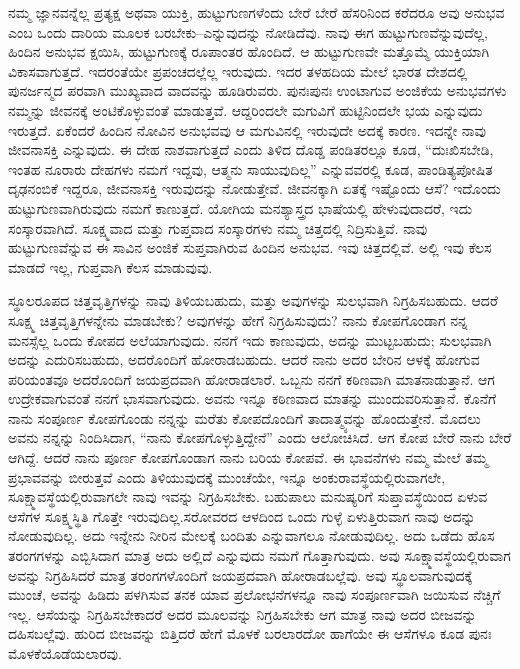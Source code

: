 ನಮ್ಮ ಜ್ಞಾನವನ್ನೆಲ್ಲ ಪ್ರತ್ಯಕ್ಷ ಅಥವಾ ಯುಕ್ತಿ, ಹುಟ್ಟುಗುಣಗಳೆಂದು ಬೇರೆ ಬೇರೆ ಹೆಸರಿನಿಂದ ಕರೆದರೂ ಅವು ಅನುಭವ ಎಂಬ ಒಂದು ದಾರಿಯ ಮೂಲಕ ಬರಬೇಕು–ಎನ್ನುವುದನ್ನು ನೋಡಿದೆವು. ನಾವು ಈಗ ಹುಟ್ಟುಗುಣವೆನ್ನುವುದೆಲ್ಲ, ಹಿಂದಿನ ಅನುಭವ ಕ್ಷಯಿಸಿ, ಹುಟ್ಟುಗುಣಕ್ಕೆ ರೂಪಾಂತರ ಹೊಂದಿದೆ. ಆ ಹುಟ್ಟುಗುಣವೇ ಮತ್ತೊಮ್ಮೆ ಯುಕ್ತಿಯಾಗಿ ವಿಕಾಸವಾಗುತ್ತದೆ. ಇದರಂತೆಯೇ ಪ್ರಪಂಚದಲ್ಲೆಲ್ಲ ಇರುವುದು. ಇದರ ತಳಹದಿಯ ಮೇಲೆ ಭಾರತ ದೇಶದಲ್ಲಿ ಪುನರ್ಜನ್ಮದ ಪರವಾಗಿ ಮುಖ್ಯವಾದ ವಾದವನ್ನು ಹೂಡಿರುವರು. ಪುನಃಪುನಃ ಉಂಟಾಗುವ ಅಂಜಿಕೆಯ ಅನುಭವಗಳು ನಮ್ಮನ್ನು ಜೀವನಕ್ಕೆ ಅಂಟಿಕೊಳ್ಳುವಂತೆ ಮಾಡುತ್ತವೆ. ಆದ್ದರಿಂದಲೇ ಮಗುವಿಗೆ ಹುಟ್ಟಿನಿಂದಲೇ ಭಯ ಎನ್ನುವುದು ಇರುತ್ತದೆ. ಏಕೆಂದರೆ ಹಿಂದಿನ ನೋವಿನ ಅನುಭವವು ಆ ಮಗುವಿನಲ್ಲಿ ಇರುವುದೇ ಅದಕ್ಕೆ ಕಾರಣ. ಇದನ್ನೇ ನಾವು ಜೀವನಾಸಕ್ತಿ ಎನ್ನುವುದು. ಈ ದೇಹ ನಾಶವಾಗುತ್ತದೆ ಎಂದು ತಿಳಿದ ದೊಡ್ಡ ಪಂಡಿತರಲ್ಲೂ ಕೂಡ, “ದುಃಖಿಸಬೇಡಿ, ಇಂತಹ ನೂರಾರು ದೇಹಗಳು ನಮಗೆ ಇದ್ದವು, ಆತ್ಮನು ಸಾಯುವುದಿಲ್ಲ” ಎನ್ನುವವರಲ್ಲಿ ಕೂಡ, ಪಾಂಡಿತ್ಯಪೋಷಿತ ದೃಢನಂಬಿಕೆ ಇದ್ದರೂ, ಜೀವನಾಸಕ್ತಿ ಇರುವುದನ್ನು ನೋಡುತ್ತೇವೆ. ಜೀವನಕ್ಕಾಗಿ ಏತಕ್ಕೆ ಇಷ್ಟೊಂದು ಆಸೆ? ಇದೊಂದು ಹುಟ್ಟುಗುಣವಾಗಿರುವುದು ನಮಗೆ ಕಾಣುತ್ತದೆ. ಯೋಗಿಯ ಮನಶ್ಯಾಸ್ತ್ರದ ಭಾಷೆಯಲ್ಲಿ ಹೇಳುವುದಾದರೆ, ಇದು ಸಂಸ್ಕಾರವಾಗಿದೆ. ಸೂಕ್ಷ್ಮವಾದ ಮತ್ತು ಗುಪ್ತವಾದ ಸಂಸ್ಕಾರಗಳು ನಮ್ಮ ಚಿತ್ತದಲ್ಲಿ ನಿದ್ರಿಸುತ್ತಿವೆ. ನಾವು ಹುಟ್ಟುಗುಣವೆನ್ನುವ ಈ ಸಾವಿನ ಅಂಜಿಕೆ ಸುಪ್ತವಾಗಿರುವ ಹಿಂದಿನ ಅನುಭವ. ಇವು ಚಿತ್ತದಲ್ಲಿವೆ. ಅಲ್ಲಿ ಇವು ಕೆಲಸ ಮಾಡದೆ ಇಲ್ಲ, ಗುಪ್ತವಾಗಿ ಕೆಲಸ ಮಾಡುವುವು. 

ಸ್ಥೂಲರೂಪದ ಚಿತ್ತವೃತ್ತಿಗಳನ್ನು ನಾವು ತಿಳಿಯಬಹುದು, ಮತ್ತು ಅವುಗಳನ್ನು ಸುಲಭವಾಗಿ ನಿಗ್ರಹಿಸಬಹುದು. ಆದರೆ ಸೂಕ್ಷ್ಮ ಚಿತ್ತವೃತ್ತಿಗಳನ್ನೇನು ಮಾಡಬೇಕು? ಅವುಗಳನ್ನು ಹೇಗೆ ನಿಗ್ರಹಿಸುವುದು? ನಾನು ಕೋಪಗೊಂಡಾಗ ನನ್ನ ಮನಸ್ಸೆಲ್ಲ ಒಂದು ಕೋಪದ ಅಲೆಯಾಗುವುದು. ನನಗೆ ಇದು ಕಾಣುವುದು, ಅದನ್ನು ಮುಟ್ಟಬಹುದು; ಸುಲಭವಾಗಿ ಅದನ್ನು ಎದುರಿಸಬಹುದು, ಅದರೊಂದಿಗೆ ಹೋರಾಡಬಹುದು. ಆದರೆ ನಾನು ಅದರ ಬೇರಿನ ಆಳಕ್ಕೆ ಹೋಗುವ ಪರಿಯಂತವೂ ಅದರೊಂದಿಗೆ ಜಯಪ್ರದವಾಗಿ ಹೋರಾಡಲಾರೆ. ಒಬ್ಬನು ನನಗೆ ಕಠಿಣವಾಗಿ ಮಾತನಾಡುತ್ತಾನೆ. ಆಗ ಉದ್ರೇಕವಾಗುವಂತೆ ನನಗೆ ಭಾಸವಾಗುವುದು. ಅವನು ಇನ್ನೂ ಕಠಿಣವಾದ ಮಾತನ್ನು ಮುಂದುವರಿಸುತ್ತಾನೆ. ಕೊನೆಗೆ ನಾನು ಸಂಪೂರ್ಣ ಕೋಪಗೊಂಡು ನನ್ನನ್ನು ಮರೆತು ಕೋಪದೊಂದಿಗೆ ತಾದಾತ್ಮ್ಯವನ್ನು ಹೊಂದುತ್ತೇನೆ. ಮೊದಲು ಅವನು ನನ್ನನ್ನು ನಿಂದಿಸಿದಾಗ, “ನಾನು ಕೋಪಗೊಳ್ಳುತ್ತಿದ್ದೇನೆ” ಎಂದು ಆಲೋಚಿಸಿದೆ. ಆಗ ಕೋಪ ಬೇರೆ ನಾನು ಬೇರೆ ಆಗಿದ್ದೆ. ಆದರೆ ನಾನು ಪೂರ್ಣ ಕೋಪಗೊಂಡಾಗ ನಾನು ಬರಿಯ ಕೋಪವೆ. ಈ ಭಾವನೆಗಳು ನಮ್ಮ ಮೇಲೆ ತಮ್ಮ ಪ್ರಭಾವವನ್ನು ಬೀರುತ್ತವೆ ಎಂದು ತಿಳಿಯುವುದಕ್ಕೆ ಮುಂಚೆಯೇ, ಇನ್ನೂ ಅಂಕುರಾವಸ್ಥೆಯಲ್ಲಿರುವಾಗಲೇ, ಸೂಕ್ಷ್ಮಾವಸ್ಥೆಯಲ್ಲಿರುವಾಗಲೇ ನಾವು ಇವನ್ನು ನಿಗ್ರಹಿಸಬೇಕು. ಬಹುಪಾಲು ಮನುಷ್ಯರಿಗೆ ಸುಪ್ತಾವಸ್ಥೆಯಿಂದ ಏಳುವ ಆಸೆಗಳ ಸೂಕ್ಷ್ಮಸ್ಥಿತಿ ಗೊತ್ತೇ ಇರುವುದಿಲ್ಲ.\break ಸರೋವರದ ಆಳದಿಂದ ಒಂದು ಗುಳ್ಳೆ ಏಳುತ್ತಿರುವಾಗ ನಾವು ಅದನ್ನು ನೋಡುವುದಿಲ್ಲ. ಅದು ಇನ್ನೇನು ನೀರಿನ ಮೇಲಕ್ಕೆ ಬಂದಿತು ಎನ್ನುವಾಗಲೂ ನೋಡುವುದಿಲ್ಲ. ಅದು ಒಡೆದು ಹೊಸ ತರಂಗಗಳನ್ನು ಎಬ್ಬಿಸಿದಾಗ ಮಾತ್ರ ಅದು ಅಲ್ಲಿದೆ ಎನ್ನುವುದು ನಮಗೆ ಗೊತ್ತಾಗುವುದು. ಅವು ಸೂಕ್ಷ್ಮಾವಸ್ಥೆಯಲ್ಲಿರುವಾಗ ಅವನ್ನು ನಿಗ್ರಹಿಸಿದರೆ ಮಾತ್ರ ತರಂಗಗಳೊಂದಿಗೆ ಜಯಪ್ರದವಾಗಿ ಹೋರಾಡಬಲ್ಲೆವು. ಅವು ಸ್ಥೂಲವಾಗುವುದಕ್ಕೆ ಮುಂಚೆ, ಅವನ್ನು ಹಿಡಿದು ಪಳಗಿಸುವ ತನಕ ಯಾವ ಪ್ರಲೋಭನೆಗಳನ್ನೂ ನಾವು ಸಂಪೂರ್ಣವಾಗಿ ಜಯಿಸುವ ನೆಚ್ಚಿಗೆ ಇಲ್ಲ. ಆಸೆಯನ್ನು ನಿಗ್ರಹಿಸಬೇಕಾದರೆ ಅದರ ಮೂಲವನ್ನು ನಿಗ್ರಹಿಸಬೇಕು ಆಗ ಮಾತ್ರ ನಾವು ಅದರ ಬೀಜವನ್ನು ದಹಿಸಬಲ್ಲೆವು. ಹುರಿದ ಬೀಜವನ್ನು ಬಿತ್ತಿದರೆ ಹೇಗೆ ಮೊಳಕೆ ಬರಲಾರದೋ ಹಾಗೆಯೇ ಈ ಆಸೆಗಳೂ ಕೂಡ ಪುನಃ ಮೊಳಕೆಯೊಡೆಯಲಾರವು. 

